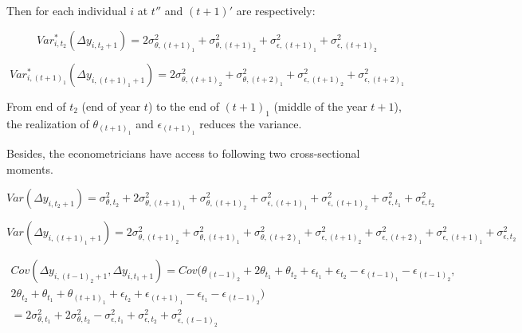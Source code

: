 \documentclass[12pt,notitlepage,onecolumn,aps,pra]{article}
\begin{document}
Then for each individual \(i\) at \(t''\) and \((t+1)'\) are
respectively:

\begin{equation}
Var^*_{i,t_2}(\Delta y_{i,t_2+1}) =  2\sigma^2_{\theta,(t+1)_1} + \sigma^2_{\theta,(t+1)_2} + \sigma^2_{\epsilon,(t+1)_1} + \sigma^2_{\epsilon,(t+1)_2}
\end{equation}

\begin{equation}
Var^*_{i,(t+1)_1}(\Delta y_{i,(t+1)_1+1}) =  2\sigma^2_{\theta,(t+1)_2} + \sigma^2_{\theta,(t+2)_1} + \sigma^2_{\epsilon,(t+1)_2} + \sigma^2_{\epsilon,(t+2)_1}
\end{equation}

From end of \(t_2\) (end of year \(t\)) to the end of \((t+1)_1\)
(middle of the year \(t+1\)), the realization of \(\theta_{(t+1)_1}\)
and \(\epsilon_{(t+1)_1}\) reduces the variance.

Besides, the econometricians have access to following two
cross-sectional moments.

\begin{equation}
Var (\Delta y_{i,t_2+1}) =  \sigma^2_{\theta,t_2} + 2\sigma^2_{\theta,(t+1)_1} + \sigma^2_{\theta,(t+1)_2} + \sigma^2_{\epsilon,(t+1)_1} + \sigma^2_{\epsilon,(t+1)_2} + \sigma^2_{\epsilon,t_1} + \sigma^2_{\epsilon,t_2} 
\end{equation}

\begin{equation}
Var (\Delta y_{i,(t+1)_1+1}) =  2\sigma^2_{\theta,(t+1)_2} + \sigma^2_{\theta,(t+1)_1} + \sigma^2_{\theta,(t+2)_1} + \sigma^2_{\epsilon,(t+1)_2} + \sigma^2_{\epsilon,(t+2)_1} + \sigma^2_{\epsilon,(t+1)_1} + \sigma^2_{\epsilon,t_2}
\end{equation}

\begin{equation}
\begin{split}
Cov ( \Delta y_{i,(t-1)_2+1},\Delta y_{i,t_1+1}) = Cov(\theta_{(t-1)_2} + 2\theta_{t_1} + \theta_{t_2} + \epsilon_{t_1} + \epsilon_{t_2} - \epsilon_{(t-1)_1} - \epsilon_{(t-1)_2} , \\
2\theta_{t_2} + \theta_{t_1} + \theta_{(t+1)_1} + \epsilon_{t_2} + \epsilon_{(t+1)_1} - \epsilon_{t_1} - \epsilon_{(t-1)_2 } ) \\
= 2\sigma^2_{\theta,t_1} + 2\sigma^2_{\theta,t_2} - \sigma^2_{\epsilon,t_1} + \sigma^2_{\epsilon,t_2} + \sigma^2_{\epsilon,(t-1)_2}
\end{split}
\end{equation}
\end{document}

